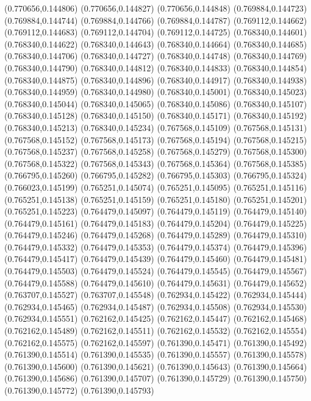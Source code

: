 (0.770656,0.144806)
(0.770656,0.144827)
(0.770656,0.144848)
(0.769884,0.144723)
(0.769884,0.144744)
(0.769884,0.144766)
(0.769884,0.144787)
(0.769112,0.144662)
(0.769112,0.144683)
(0.769112,0.144704)
(0.769112,0.144725)
(0.768340,0.144601)
(0.768340,0.144622)
(0.768340,0.144643)
(0.768340,0.144664)
(0.768340,0.144685)
(0.768340,0.144706)
(0.768340,0.144727)
(0.768340,0.144748)
(0.768340,0.144769)
(0.768340,0.144790)
(0.768340,0.144812)
(0.768340,0.144833)
(0.768340,0.144854)
(0.768340,0.144875)
(0.768340,0.144896)
(0.768340,0.144917)
(0.768340,0.144938)
(0.768340,0.144959)
(0.768340,0.144980)
(0.768340,0.145001)
(0.768340,0.145023)
(0.768340,0.145044)
(0.768340,0.145065)
(0.768340,0.145086)
(0.768340,0.145107)
(0.768340,0.145128)
(0.768340,0.145150)
(0.768340,0.145171)
(0.768340,0.145192)
(0.768340,0.145213)
(0.768340,0.145234)
(0.767568,0.145109)
(0.767568,0.145131)
(0.767568,0.145152)
(0.767568,0.145173)
(0.767568,0.145194)
(0.767568,0.145215)
(0.767568,0.145237)
(0.767568,0.145258)
(0.767568,0.145279)
(0.767568,0.145300)
(0.767568,0.145322)
(0.767568,0.145343)
(0.767568,0.145364)
(0.767568,0.145385)
(0.766795,0.145260)
(0.766795,0.145282)
(0.766795,0.145303)
(0.766795,0.145324)
(0.766023,0.145199)
(0.765251,0.145074)
(0.765251,0.145095)
(0.765251,0.145116)
(0.765251,0.145138)
(0.765251,0.145159)
(0.765251,0.145180)
(0.765251,0.145201)
(0.765251,0.145223)
(0.764479,0.145097)
(0.764479,0.145119)
(0.764479,0.145140)
(0.764479,0.145161)
(0.764479,0.145183)
(0.764479,0.145204)
(0.764479,0.145225)
(0.764479,0.145246)
(0.764479,0.145268)
(0.764479,0.145289)
(0.764479,0.145310)
(0.764479,0.145332)
(0.764479,0.145353)
(0.764479,0.145374)
(0.764479,0.145396)
(0.764479,0.145417)
(0.764479,0.145439)
(0.764479,0.145460)
(0.764479,0.145481)
(0.764479,0.145503)
(0.764479,0.145524)
(0.764479,0.145545)
(0.764479,0.145567)
(0.764479,0.145588)
(0.764479,0.145610)
(0.764479,0.145631)
(0.764479,0.145652)
(0.763707,0.145527)
(0.763707,0.145548)
(0.762934,0.145422)
(0.762934,0.145444)
(0.762934,0.145465)
(0.762934,0.145487)
(0.762934,0.145508)
(0.762934,0.145530)
(0.762934,0.145551)
(0.762162,0.145425)
(0.762162,0.145447)
(0.762162,0.145468)
(0.762162,0.145489)
(0.762162,0.145511)
(0.762162,0.145532)
(0.762162,0.145554)
(0.762162,0.145575)
(0.762162,0.145597)
(0.761390,0.145471)
(0.761390,0.145492)
(0.761390,0.145514)
(0.761390,0.145535)
(0.761390,0.145557)
(0.761390,0.145578)
(0.761390,0.145600)
(0.761390,0.145621)
(0.761390,0.145643)
(0.761390,0.145664)
(0.761390,0.145686)
(0.761390,0.145707)
(0.761390,0.145729)
(0.761390,0.145750)
(0.761390,0.145772)
(0.761390,0.145793)
